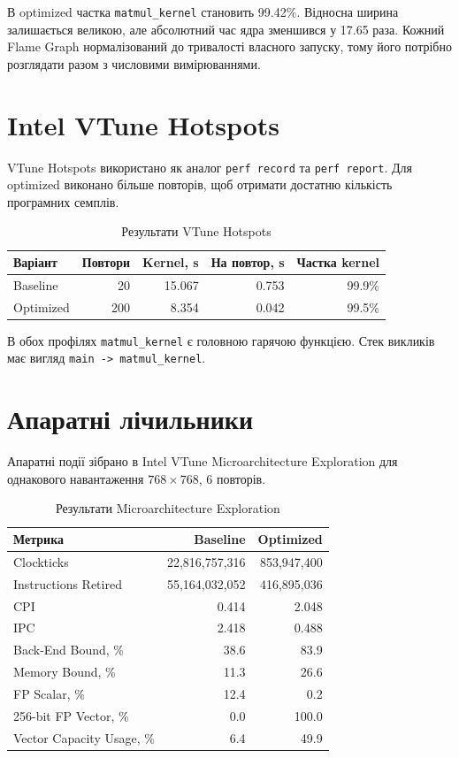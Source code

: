 \documentclass[12pt,a4paper]{article}
\begin{document}
В optimized частка \texttt{matmul\_kernel} становить 99.42\%. Відносна ширина залишається великою, але абсолютний час ядра зменшився у 17.65 раза. Кожний Flame Graph нормалізований до тривалості власного запуску, тому його потрібно розглядати разом з числовими вимірюваннями.

\section{Intel VTune Hotspots}

VTune Hotspots використано як аналог \texttt{perf record} та \texttt{perf report}. Для optimized виконано більше повторів, щоб отримати достатню кількість програмних семплів.

\begin{table}[H]
\centering
\begin{tabular}{@{}lrrrr@{}}
\toprule
Варіант & Повтори & Kernel, s & На повтор, s & Частка kernel \\
\midrule
Baseline & 20 & 15.067 & 0.753 & 99.9\% \\
Optimized & 200 & 8.354 & 0.042 & 99.5\% \\
\bottomrule
\end{tabular}
\caption{Результати VTune Hotspots}
\end{table}

В обох профілях \texttt{matmul\_kernel} є головною гарячою функцією. Стек викликів має вигляд \texttt{main -> matmul\_kernel}.

\section{Апаратні лічильники}

Апаратні події зібрано в Intel VTune Microarchitecture Exploration для однакового навантаження $768\times768$, 6 повторів.

\begin{table}[H]
\centering
\begin{tabular}{@{}lrr@{}}
\toprule
Метрика & Baseline & Optimized \\
\midrule
Clockticks & 22,816,757,316 & 853,947,400 \\
Instructions Retired & 55,164,032,052 & 416,895,036 \\
CPI & 0.414 & 2.048 \\
IPC & 2.418 & 0.488 \\
Back-End Bound, \% & 38.6 & 83.9 \\
Memory Bound, \% & 11.3 & 26.6 \\
FP Scalar, \% & 12.4 & 0.2 \\
256-bit FP Vector, \% & 0.0 & 100.0 \\
Vector Capacity Usage, \% & 6.4 & 49.9 \\
\bottomrule
\end{tabular}
\caption{Результати Microarchitecture Exploration}
\end{table}
\end{document}
